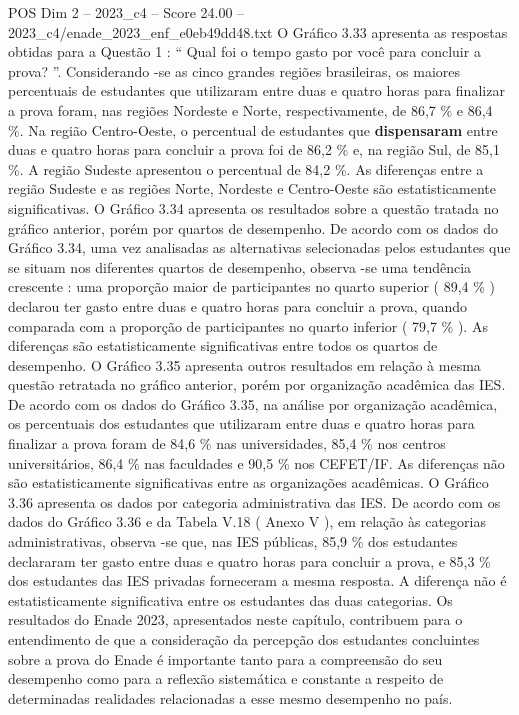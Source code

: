 \begin{textsample}{POS Dim 2 – 2023\_c4 – Score 24.00 – 2023\_c4/enade\_2023\_enf\_e0eb49dd48.txt}
O Gráfico 3.33 apresenta as respostas obtidas para a Questão 1 : “ Qual foi o tempo gasto por você para concluir a prova? ”.
Considerando -se as cinco grandes regiões brasileiras, os maiores percentuais de estudantes que utilizaram entre duas e quatro horas para finalizar a prova foram, nas regiões Nordeste e Norte, respectivamente, de 86,7 \% e 86,4 \%.
Na região Centro-Oeste, o percentual de estudantes que \textbf{dispensaram} entre duas e quatro horas para concluir a prova foi de 86,2 \% e, na região Sul, de 85,1 \%.
A região Sudeste apresentou o percentual de 84,2 \%.
As diferenças entre a região Sudeste e as regiões Norte, Nordeste e Centro-Oeste são estatisticamente significativas.
O Gráfico 3.34 apresenta os resultados sobre a questão tratada no gráfico anterior, porém por quartos de desempenho.
De acordo com os dados do Gráfico 3.34, uma vez analisadas as alternativas selecionadas pelos estudantes que se situam nos diferentes quartos de desempenho, observa -se uma tendência crescente : uma proporção maior de participantes no quarto superior ( 89,4 \% ) declarou ter gasto entre duas e quatro horas para concluir a prova, quando comparada com a proporção de participantes no quarto inferior ( 79,7 \% ).
As diferenças são estatisticamente significativas entre todos os quartos de desempenho.
O Gráfico 3.35 apresenta outros resultados em relação à mesma questão retratada no gráfico anterior, porém por organização acadêmica das IES.
De acordo com os dados do Gráfico 3.35, na análise por organização acadêmica, os percentuais dos estudantes que utilizaram entre duas e quatro horas para finalizar a prova foram de 84,6 \% nas universidades, 85,4 \% nos centros universitários, 86,4 \% nas faculdades e 90,5 \% nos CEFET/IF.
As diferenças não são estatisticamente significativas entre as organizações acadêmicas.
O Gráfico 3.36 apresenta os dados por categoria administrativa das IES.
De acordo com os dados do Gráfico 3.36 e da Tabela V.18 ( Anexo V ), em relação às categorias administrativas, observa -se que, nas IES públicas, 85,9 \% dos estudantes declararam ter gasto entre duas e quatro horas para concluir a prova, e 85,3 \% dos estudantes das IES privadas forneceram a mesma resposta.
A diferença não é estatisticamente significativa entre os estudantes das duas categorias.
Os resultados do Enade 2023, apresentados neste capítulo, contribuem para o entendimento de que a consideração da percepção dos estudantes concluintes sobre a prova do Enade é importante tanto para a compreensão do seu desempenho como para a reflexão sistemática e constante a respeito de determinadas realidades relacionadas a esse mesmo desempenho no país.

\end{textsample}

